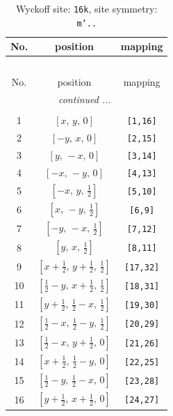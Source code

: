 \documentclass[fleqn,8pt]{jsarticle}
\begin{document}
\renewcommand{\arraystretch}{1.2}
\begin{longtable}{ccc}
\caption{Wyckoff site: {\tt 16k}, site symmetry: {\tt m'..}}
 \\
 \hline \hline
No. & position & mapping \\ \hline \endfirsthead

\multicolumn{2}{l}{\tablename\ \thetable{}} \\
 \hline \hline
No. & position & mapping \\ \hline \endhead

 \hline \hline
\multicolumn{2}{r}{\footnotesize\it continued ...} \\ \endfoot

 \hline \hline
\multicolumn{2}{r}{} \\ \endlastfoot

1 & $\left[ x,\, y,\, 0 \right]$ & {\tt [1,16]} \\ \hline
2 & $\left[ - y,\, x,\, 0 \right]$ & {\tt [2,15]} \\ \hline
3 & $\left[ y,\, - x,\, 0 \right]$ & {\tt [3,14]} \\ \hline
4 & $\left[ - x,\, - y,\, 0 \right]$ & {\tt [4,13]} \\ \hline
5 & $\left[ - x,\, y,\, \frac{1}{2} \right]$ & {\tt [5,10]} \\ \hline
6 & $\left[ x,\, - y,\, \frac{1}{2} \right]$ & {\tt [6,9]} \\ \hline
7 & $\left[ - y,\, - x,\, \frac{1}{2} \right]$ & {\tt [7,12]} \\ \hline
8 & $\left[ y,\, x,\, \frac{1}{2} \right]$ & {\tt [8,11]} \\ \hline
9 & $\left[ x + \frac{1}{2},\, y + \frac{1}{2},\, \frac{1}{2} \right]$ & {\tt [17,32]} \\ \hline
10 & $\left[ \frac{1}{2} - y,\, x + \frac{1}{2},\, \frac{1}{2} \right]$ & {\tt [18,31]} \\ \hline
11 & $\left[ y + \frac{1}{2},\, \frac{1}{2} - x,\, \frac{1}{2} \right]$ & {\tt [19,30]} \\ \hline
12 & $\left[ \frac{1}{2} - x,\, \frac{1}{2} - y,\, \frac{1}{2} \right]$ & {\tt [20,29]} \\ \hline
13 & $\left[ \frac{1}{2} - x,\, y + \frac{1}{2},\, 0 \right]$ & {\tt [21,26]} \\ \hline
14 & $\left[ x + \frac{1}{2},\, \frac{1}{2} - y,\, 0 \right]$ & {\tt [22,25]} \\ \hline
15 & $\left[ \frac{1}{2} - y,\, \frac{1}{2} - x,\, 0 \right]$ & {\tt [23,28]} \\ \hline
16 & $\left[ y + \frac{1}{2},\, x + \frac{1}{2},\, 0 \right]$ & {\tt [24,27]} \\
\end{longtable}
\end{document}
